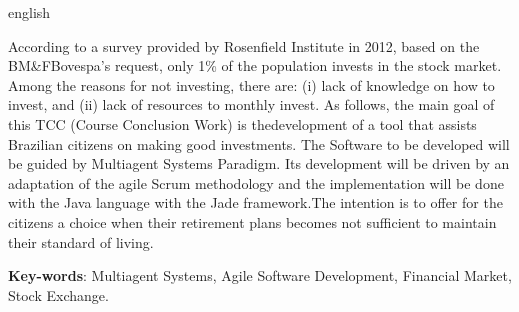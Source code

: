 \begin{resumo}[Abstract]
 \begin{otherlanguage*}{english}
   
   According to a survey provided by Rosenfield Institute in 2012, based on the BM\&FBovespa's request, only 1\% of the population invests in the stock market. Among the reasons for not investing, there are: (i) lack of knowledge on how to invest, and (ii) lack of resources to monthly invest. As follows, the main goal of this TCC (Course Conclusion Work) is thedevelopment of a tool that assists Brazilian citizens on making good investments. The Software to be developed will be guided by Multiagent Systems Paradigm. Its development will be driven by an adaptation of the agile Scrum methodology and the implementation will be done with the Java language with the Jade framework.The intention is to offer for the citizens a choice when their retirement plans becomes not sufficient to maintain their standard of living.


   \vspace{\onelineskip}
 
   \noindent 
   \textbf{Key-words}: Multiagent Systems, Agile Software Development, Financial Market, Stock Exchange.
 \end{otherlanguage*}
\end{resumo}

